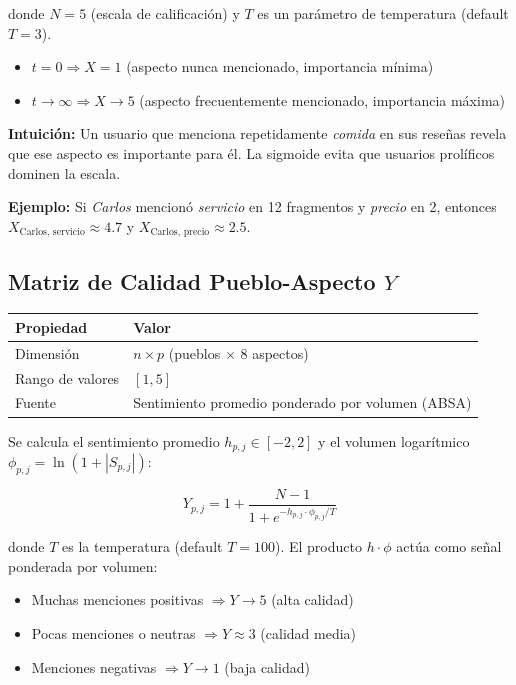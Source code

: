 \documentclass[11pt, a4paper]{article}
\begin{document}
donde $N = 5$ (escala de calificación) y $T$ es un parámetro de temperatura (default $T=3$).

\begin{itemize}
    \item $t = 0 \Rightarrow X = 1$ (aspecto nunca mencionado, importancia mínima)
    \item $t \to \infty \Rightarrow X \to 5$ (aspecto frecuentemente mencionado, importancia máxima)
\end{itemize}

\textbf{Intuición:} Un usuario que menciona repetidamente \textit{comida} en sus reseñas revela que ese aspecto es importante para él. La sigmoide evita que usuarios prolíficos dominen la escala.

\textbf{Ejemplo:} Si \textit{Carlos} mencionó \textit{servicio} en 12 fragmentos y \textit{precio} en 2, entonces $X_{\text{Carlos, servicio}} \approx 4.7$ y $X_{\text{Carlos, precio}} \approx 2.5$.

\subsection{Matriz de Calidad Pueblo-Aspecto $Y$}

\begin{table}[H]\centering
\begin{tabular}{ll}
\toprule
\textbf{Propiedad} & \textbf{Valor} \\
\midrule
Dimensión       & $n \times p$ (pueblos $\times$ 8 aspectos) \\
Rango de valores & $[1, 5]$ \\
Fuente          & Sentimiento promedio ponderado por volumen (ABSA) \\
\bottomrule
\end{tabular}
\end{table}

Se calcula el sentimiento promedio $h_{p,j} \in [-2, 2]$ y el volumen logarítmico $\phi_{p,j} = \ln(1 + |S_{p,j}|)$:

\begin{equation}
    Y_{p,j} = 1 + \frac{N-1}{1 + e^{-h_{p,j} \cdot \phi_{p,j} / T}}
    \label{eq:Y}
\end{equation}

donde $T$ es la temperatura (default $T=100$). El producto $h \cdot \phi$ actúa como señal ponderada por volumen:

\begin{itemize}
    \item Muchas menciones positivas $\Rightarrow Y \to 5$ (alta calidad)
    \item Pocas menciones o neutras $\Rightarrow Y \approx 3$ (calidad media)
    \item Menciones negativas $\Rightarrow Y \to 1$ (baja calidad)
\end{itemize}
\end{document}
